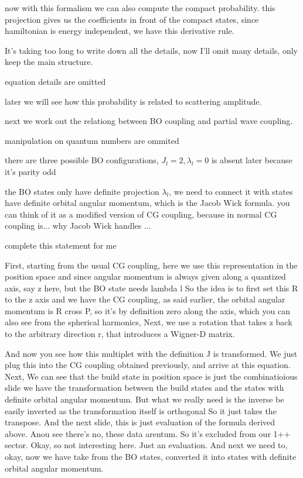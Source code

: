 \documentclass[11pt,a4paper]{article}
\newcommand{\draftcue}[1]{\begin{private}#1\end{private}}
\begin{document}
now with this formalism we can also compute the compact probability. this projection gives us the coefficients in front of the compact states, since hamiltonian is energy independent, we have this derivative rule.

It's taking too long to write down all the details, now I'll omit many details, only keep the main structure.
\draftcue{equation details are omitted}
later we will see how this probability is related to scattering amplitude.

next we work out the relationg between BO coupling and partial wave coupling.
\draftcue{manipulation on quantum numbers are ommited}
there are three possible BO configurations, $J_l = 2, \lambda_l = 0$ is absent later because it's parity odd

the BO states only have definite projection $\lambda_l$, we need to connect it with states have definite orbital angular momentum, which is the Jacob Wick formula. you can think of it as a modified version of CG coupling, because in normal CG coupling is... why Jacob Wick handles ...\draftcue{complete this statement for me}

First, starting from the usual CG coupling, here we use this representation in the position space and since angular momentum is always given along a quantized axis, say z here, but the BO state needs lambda l So the idea is to first set this R to the z axis and we have the CG coupling, as said earlier, the orbital angular momentum is R cross P, so it's by definition zero along the axis, which you can also see from the spherical harmonics, Next, we use a rotation that takes z back to the arbitrary direction r, that introduces a Wigner-D matrix.

And now you see how this multiplet with the definition J is transformed. We just plug this into the CG coupling obtained previously, and arrive at this equation. Next, We can see that the build state in position space is just the combinatioious slide we have the transformation between the build states and the states with definite orbital angular momentum. But what we really need is the inverse  be easily inverted as the transformation itself is orthogonal So it just takes the transpose. And the next slide, this is just evaluation of the formula derived above. Anou see there's no, these data arentum. So it's excluded from our 1++ sector. Okay, so not interesting here. Just an evaluation. And next we need to, okay, now we have take from the BO states, converted it into states with definite orbital angular momentum.
\end{document}
